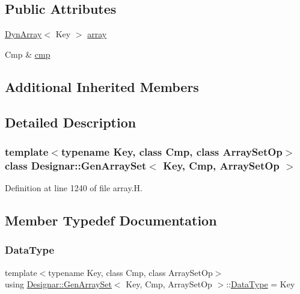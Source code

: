 \subsection*{Public Attributes}
\begin{DoxyCompactItemize}
\item 
\hyperlink{class_designar_1_1_dyn_array}{Dyn\+Array}$<$ Key $>$ \hyperlink{class_designar_1_1_gen_array_set_a8118f689e762c993ed0ba7394a8f480a}{array}
\item 
Cmp \& \hyperlink{class_designar_1_1_gen_array_set_a2b1e3c653865a794eab7d19e43c1b0de}{cmp}
\end{DoxyCompactItemize}
\subsection*{Additional Inherited Members}


\subsection{Detailed Description}
\subsubsection*{template$<$typename Key, class Cmp, class Array\+Set\+Op$>$\newline
class Designar\+::\+Gen\+Array\+Set$<$ Key, Cmp, Array\+Set\+Op $>$}



Definition at line 1240 of file array.\+H.



\subsection{Member Typedef Documentation}
\mbox{\label{class_designar_1_1_gen_array_set_ac69f0c0b76358cd5effd2dc05bd724ee}} 
\subsubsection{\texorpdfstring{Data\+Type}{DataType}}
{\footnotesize\ttfamily template$<$typename Key, class Cmp, class Array\+Set\+Op$>$ \\
using \hyperlink{class_designar_1_1_gen_array_set}{Designar\+::\+Gen\+Array\+Set}$<$ Key, Cmp, Array\+Set\+Op $>$\+::\hyperlink{class_designar_1_1_gen_array_set_ac69f0c0b76358cd5effd2dc05bd724ee}{Data\+Type} =  Key}



